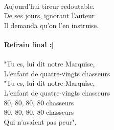 \\Aujourd'hui tireur redoutable.
\\De ses jours, ignorant l'auteur
\\Il demanda qu'on l'en instruise.
\\\\\textbf{Refrain final :}]
\\\\"Tu es, lui dit notre Marquise,
\\L'enfant de quatre-vingts chasseurs
\\"Tu es, lui dit notre Marquise,
\\L'enfant de quatre-vingts chasseurs
\\80, 80, 80, 80 chasseurs
\\80, 80, 80, 80 chasseurs
\\Qui n'avaient pas peur".
